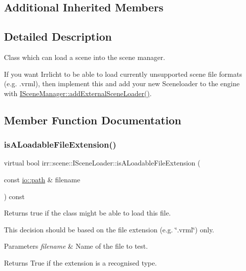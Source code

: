 \subsection*{Additional Inherited Members}


\subsection{Detailed Description}
Class which can load a scene into the scene manager. 

If you want Irrlicht to be able to load currently unsupported scene file formats (e.\+g. .vrml), then implement this and add your new Sceneloader to the engine with \hyperlink{classirr_1_1scene_1_1ISceneManager_a8f0bc0221c4faaca80ac8f560ee424ef}{I\+Scene\+Manager\+::add\+External\+Scene\+Loader()}. 

\subsection{Member Function Documentation}
\mbox{\label{classirr_1_1scene_1_1ISceneLoader_a55b0367762135b84a077ef75ca942594}} 
\subsubsection{\texorpdfstring{is\+A\+Loadable\+File\+Extension()}{isALoadableFileExtension()}}
{\footnotesize\ttfamily virtual bool irr\+::scene\+::\+I\+Scene\+Loader\+::is\+A\+Loadable\+File\+Extension (\begin{DoxyParamCaption}\item[{const \hyperlink{namespaceirr_1_1io_ab1bdc45edb3f94d8319c02bc0f840ee1}{io\+::path} \&}]{filename }\end{DoxyParamCaption}) const\hspace{0.3cm}{\ttfamily [pure virtual]}}



Returns true if the class might be able to load this file. 

This decision should be based on the file extension (e.\+g. \char`\"{}.\+vrml\char`\"{}) only. 
\begin{DoxyParams}{Parameters}
{\em filename} & Name of the file to test. \\
\hline
\end{DoxyParams}
\begin{DoxyReturn}{Returns}
True if the extension is a recognised type. 
\end{DoxyReturn}
\mbox{\label{classirr_1_1scene_1_1ISceneLoader_a5f1b2f44fcac12acdc2f1948d8f3b258}} 
